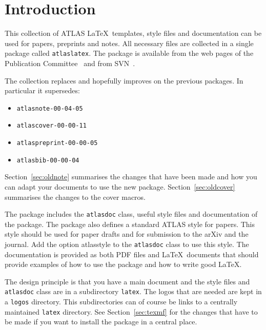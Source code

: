 \documentclass[atlasstyle,UKenglish]{latex/atlasdoc}
\author{Ian C. Brock}
\affil{University of Bonn}
\newcommand{\File}[1]{\texttt{#1}\xspace}
\newcommand{\Option}[1]{\textsf{#1}\xspace}
\newcommand{\Package}[1]{\texttt{#1}\xspace}
\begin{document}
\tableofcontents
\clearpage

\section{Introduction}
\label{sec:intro}

This collection of ATLAS \LaTeX\ templates, style files and documentation
can be used for papers, preprints and notes. 
All necessary files are collected in a single package called \texttt{atlaslatex}.
The package is available from the web pages of the Publication Committee~\cite{pubcom} and from 
SVN~\cite{pubcom-svn}.

The collection replaces and hopefully improves on the previous packages. 
In particular it supersedes:
\begin{itemize}\setlength{\parskip}{0pt}\setlength{\itemsep}{0pt}
\item \texttt{atlasnote-00-04-05}
\item \texttt{atlascover-00-00-11}
\item \texttt{atlaspreprint-00-00-05}
\item \texttt{atlasbib-00-00-04}
\end{itemize}
Section~\ref{sec:oldnote} summarises the changes that have been made and
how you can adapt your documents to use the new package.
Section~\ref{sec:oldcover} summarises the changes to the cover macros.

The package includes the \Package{atlasdoc} class, useful style files
and documentation of the package.
The package also defines a standard ATLAS style for papers.
This style should be used for paper drafts and for submission to the arXiv and the journal.
Add the option \Option{atlasstyle} to the \Package{atlasdoc} class to use this style.
The documentation is provided as both PDF files and \LaTeX\ documents
that should provide examples of how to use the package and how to write
good \LaTeX.

The design principle is that you have a main document and 
the style files and \Package{atlasdoc} class are in a subdirectory \File{latex}.
The logos that are needed are kept in a \File{logos} directory.
This subdirectories can of course be links to a centrally maintained \texttt{latex} directory.
See Section~\ref{sec:texmf} for the changes that have to be made if you want to install
the package in a central place.
\end{document}

